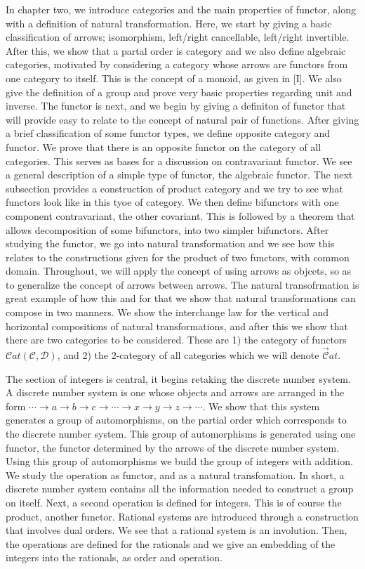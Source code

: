 \documentclass [12pt]{book}
\begin{document}
In chapter two, we introduce categories and the main properties of functor, along with a definition of natural transformation. Here, we start by giving a basic classification of arrows; isomorphism, left/right cancellable, left/right invertible. After this, we show that a partal order is category and we also define algebraic categories, motivated by considering a category whose arrows are functors from one category to itself. This is the concept of a monoid, as given in [I]. We also give the definition of a group and prove very basic properties regarding unit and inverse. The functor is next, and we begin by giving a definiton of functor that will provide easy to relate to the concept of natural pair of functions. After giving a brief classification of some functor types, we define opposite category and functor. We prove that there is an opposite functor on the category of all categories. This serves as bases for a discussion on contravariant functor. We see a general description of a simple type of functor, the algebraic functor. The next subsection provides a construction of product category and we try to see what functors look like in this tyoe of category. We then define bifunctors with one component contravariant, the other covariant. This is followed by a theorem that allows decomposition of some bifunctors, into two simpler bifunctors. After studying the functor, we go into natural transformation and we see how this relates to the constructions given for the product of two functors, with common domain. Throughout, we will apply the concept of using arrows as objcets, so as to generalize the concept of arrows between arrows. The natural transofrmation is great example of how this and for that we show that natural transformations can compose in two manners. We show the interchange law for the vertical and horizontal compositions of natural transformations, and after this we show that there are two categories to be considered. These are 1) the category of functors $\mathcal Cat(\mathcal C,\mathcal D)$, and 2) the 2-category of all categories which we will denote $\vec{\mathcal C}at$.

The section of integers is central, it begins retaking the discrete number system. A discrete number system is one whose objects and arrows are arranged in the form $\cdots\rightarrow a\rightarrow b\rightarrow c\rightarrow\cdots\rightarrow x\rightarrow y\rightarrow z\rightarrow\cdots$. We show that this system generates a group of automorphisms, on the partial order which corresponds to the discrete number system. This group of automorphisms is generated using one functor, the functor determined by the arrows of the discrete number system. Using this group of automorphisms we build the group of integers with addition. We study the operation as functor, and as a natural transfomation. In short, a discrete number system contains all the information needed to construct a group on itself. Next, a second operation is defined for integers. This is of course the product, another functor. Rational systems are introduced through a construction that involves dual orders. We see that a rational system is an involution. Then, the operations are defined for the rationals and we give an embedding of the integers into the rationals, as order and operation.
\end{document}
